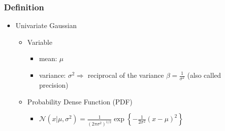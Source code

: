 \subsubsection{Definition}
\begin{itemize}
\item Univariate Gaussian
	\begin{itemize}
	\item Variable
		\begin{itemize}
		\item mean: $\mu$
		\item variance: $\sigma^2 \Rightarrow$ reciprocal of the variance $\beta = \frac 1 {\sigma^2}$ (also called precision)
		\end{itemize}
	\item Probability Dense Function (PDF)
		\begin{itemize}
		\item $\displaystyle \mathcal N(x|\mu, \sigma^2) = \frac 1 {(2\pi \sigma^2)^{1/2}} \exp \left\{ -\frac 1 {2\sigma^2}(x-\mu)^2 \right\}$
		

\end{itemize}
\end{itemize}
\end{itemize}
